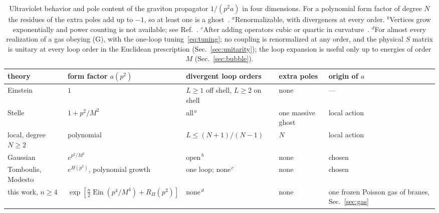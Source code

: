 \documentclass[a4paper,11pt]{article}
\newcommand{\Ein}{\operatorname{Ein}}
\begin{document}
\begin{table}[t]
\centering
\small\begin{adjustbox}{max width=\linewidth}\begin{tabular}{p{3.9cm}p{3.6cm}p{3.6cm}p{2.4cm}p{3.2cm}}
theory & form factor $a(p^2)$ & divergent loop orders & extra poles & origin of $a$\\
\hline
Einstein~\cite{tHooftVeltman1974,GoroffSagnotti1986} & $1$ & $L\ge1$ off shell, $L\ge2$ on shell & none & ---\\
Stelle~\cite{Stelle1977} & $1+p^2/M^2$ & all$^{\,a}$ & one massive ghost & local action\\
local, degree $N\ge2$~\cite{AsoreyLopezShapiro1997} & polynomial & $L\le(N+1)/(N-1)$ & $N$ & local action\\
Gaussian~\cite{BiswasMazumdarSiegel2006,BGKM2012} & $e^{p^2/M^2}$ & open$^{\,b}$ & none & chosen\\
Tomboulis, Modesto~\cite{Tomboulis1997,Modesto2012} & $e^{H(p^2)}$, polynomial growth & one loop; none$^{\,c}$ & none & chosen\\
this work, $n\ge4$ & $\exp[\frac n2\Ein(p^4/M^4)+R_\Pi(p^2)]$ & none$^{\,d}$ & none & one frozen Poisson gas of branes, Sec.~\ref{sec:gas}\\
\hline\hline
\end{tabular}\end{adjustbox}
\caption{Ultraviolet behavior and pole content of the graviton propagator $1/(p^2a)$ in four dimensions. For a polynomial form factor of degree $N$ the residues of the extra poles add up to $-1$, so at least one is a ghost~\cite{Shapiro2015}. ${}^a$Renormalizable, with divergences at every order. ${}^b$Vertices grow exponentially and power counting is not available; see Ref.~\cite{Talaganis2015}. ${}^c$After adding operators cubic or quartic in curvature~\cite{ModestoRachwal2014}. ${}^d$For almost every realization of a gas obeying (G), with the one-loop tuning~\eqref{eq:tuning}; no coupling is renormalized at any order, and the physical $S$ matrix is unitary at every loop order in the Euclidean prescription (Sec.~\ref{sec:unitarity}); the loop expansion is useful only up to energies of order $M$ (Sec.~\ref{sec:bubble}).}
\label{tab:compare}
\end{table}
\end{document}
